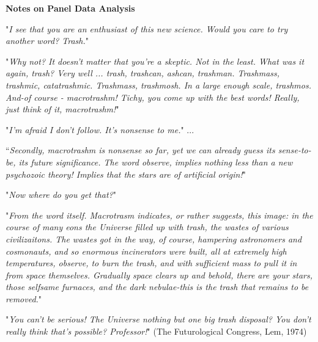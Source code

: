 \documentclass[landscape,letterpaper,9pt]{article}
\begin{document}
\let\Footnotesize=\large
\let\Tiny=\large
\let\small=\Large
\let\normalsize=\LARGE
\let\large=\Large
\let\Large=\Large

\sffamily
\large
\newcommand{\us}[2]{\ensuremath{\underset{\left(#2\right)}{#1}}}




\begin{center}
\textbf{Notes on  Panel Data Analysis}
\end{center}

\vspace{0.2in}

"\textit{I see that you are an enthusiast of this new science. Would you care to try another word? Trash.}"

"\textit{Why not? It doesn't matter that you're a skeptic. Not in the least. What was it again, trash? Very well ... trash,
trashcan, ashcan, trashman. Trashmass, trashmic, catatrashmic. Trashmass, trashmosh.
In a large enough scale, trashmos. And-of course - macrotrashm! Tichy, you come up with the best words!
Really, just think of it, macrotrashm!}"

"\textit{I'm afraid I don't follow. It's nonsense to me.}" ...

``\textit{Secondly, macrotrashm is nonsense so far, yet we can already guess its sense-to-be,
its future significance.
The word observe, implies nothing less than a new psychozoic theory!
Implies that the stars are of artificial origin!}"

"\textit{Now where do you get that?}"

"\textit{From the word itself. Macrotrasm indicates, or rather suggests, this image:
in the course of many eons the Universe filled up with trash, the wastes of various
civilizaitons. The wastes got in the way, of course, hampering astronomers and cosmonauts,
and so enormous incinerators were built, all at extremely high temperatures, observe, to
burn the trash, and with sufficient mass to pull it in from space themselves.
Gradually space clears up and behold, there are your stars, those selfsame furnaces,
and the dark nebulae-this is the trash that remains to be removed.}"

"\textit{You can't be serious! The Universe nothing but one big trash disposal?
You don't really think that's possible? Professor!}"
(The Futurological Congress, Lem, 1974)
\end{document}
